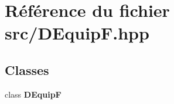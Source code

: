 \section{Référence du fichier src/\-D\-Equip\-F.hpp}
\label{_d_equip_f_8hpp}
\subsection*{Classes}
\begin{DoxyCompactItemize}
\item 
class {\bf D\-Equip\-F}
\end{DoxyCompactItemize}
